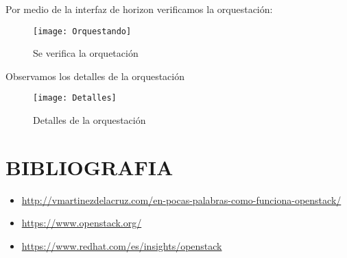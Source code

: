 \documentclass[10pt]{article}   			%
\begin{document}
\begin{enumerate}
Por medio de la interfaz de horizon verificamos la orquestación:

\begin{figure}[H]
	\centering
	\texttt{[image: Orquestando]}  
	\caption{Se verifica la orquetación} 
\end{figure}


Observamos los detalles de la orquestación


\begin{figure}[ht]
	\centering
	\texttt{[image: Detalles]}  
	\caption{Detalles de la orquestación} 
\end{figure}

\section{BIBLIOGRAFIA}
\begin{itemize}
	\item \href{http://vmartinezdelacruz.com/en-pocas-palabras-como-funciona-openstack/}{http://vmartinezdelacruz.com/en-pocas-palabras-como-funciona-openstack/}
	\item \href{https://www.openstack.org/}{https://www.openstack.org/}
	\item \href{https://www.redhat.com/es/insights/openstack}{https://www.redhat.com/es/insights/openstack}
\end{itemize}






\end{enumerate}	
\end{document}
